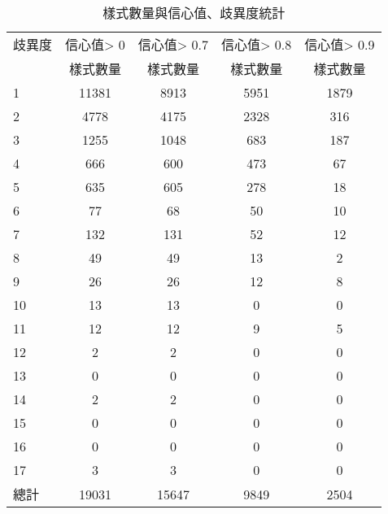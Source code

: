 \begin{table}[t]
    \begin{center}
        \small
        \begin{tabular}{l||c|c|c|c}
        \hline
        歧異度 & 信心值> 0 & 信心值> 0.7 & 信心值> 0.8 & 信心值> 0.9\\
          & 樣式數量 & 樣式數量 & 樣式數量 & 樣式數量 \\
        \hline
        1 & 11381 & 8913 & 5951 & 1879 \\
        2 & 4778 & 4175 & 2328 & 316 \\
        3 & 1255 & 1048 & 683 & 187 \\
        4 & 666 & 600 & 473 & 67 \\
        5 & 635 & 605 & 278 & 18 \\
        6 & 77 & 68 & 50 & 10 \\
        7 & 132 & 131 & 52 & 12 \\
        8 & 49 & 49 & 13 & 2 \\
        9 & 26 & 26 & 12 & 8 \\
        10 & 13 & 13 & 0 & 0 \\
        11 & 12 & 12 & 9 & 5 \\
        12 & 2 & 2 & 0 & 0 \\
        13 & 0 & 0 & 0 & 0 \\
        14 & 2 & 2 & 0 & 0 \\
        15 & 0 & 0 & 0 & 0 \\
        16 & 0 & 0 & 0 & 0 \\
        17 & 3 & 3 & 0 & 0 \\
        \hline
        總計 & 19031 & 15647 & 9849 & 2504 \\
        \hline
        \end{tabular}
        \caption{樣式數量與信心值、歧異度統計}
        \label{t:yago-degree}
    \end{center}
\end{table}
